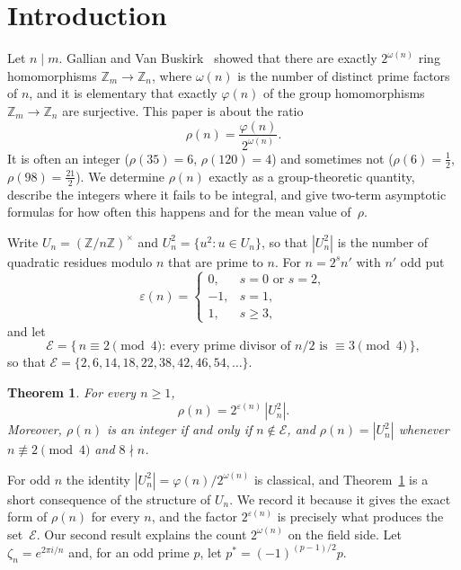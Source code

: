 \documentclass[11pt]{article}
\newtheorem{theorem}{Theorem}[section]
\theoremstyle{definition}
\newcommand{\Z}{\mathbb{Z}}
\newcommand{\E}{\mathcal{E}}
\renewcommand{\phi}{\varphi}
\renewcommand{\epsilon}{\varepsilon}
\begin{document}
\vspace{4mm}

\section{Introduction}\label{sec:intro}

Let $n\mid m$. Gallian and Van Buskirk~\cite{GVB} showed that there are exactly $2^{\omega(n)}$ ring homomorphisms $\Z_m\to\Z_n$, where $\omega(n)$ is the number of distinct prime factors of $n$, and it is elementary that exactly $\phi(n)$ of the group homomorphisms $\Z_m\to\Z_n$ are surjective. This paper is about the ratio
\begin{equation}\label{eq:rho}
  \rho(n)=\frac{\phi(n)}{2^{\omega(n)}} .
\end{equation}
It is often an integer ($\rho(35)=6$, $\rho(120)=4$) and sometimes not ($\rho(6)=\tfrac12$, $\rho(98)=\tfrac{21}{2}$). We determine $\rho(n)$ exactly as a group-theoretic quantity, describe the integers where it fails to be integral, and give two-term asymptotic formulas for how often this happens and for the mean value of~$\rho$.

Write $U_n=(\Z/n\Z)^\times$ and $U_n^2=\{u^2:u\in U_n\}$, so that $|U_n^2|$ is the number of quadratic residues modulo $n$ that are prime to $n$. For $n=2^s n'$ with $n'$ odd put
\begin{equation}\label{eq:eps}
  \epsilon(n)=\begin{cases} 0, & s=0 \text{ or } s=2,\\ -1, & s=1,\\ 1, & s\ge 3,\end{cases}
\end{equation}
and let
\begin{equation}\label{eq:E}
  \E=\{\,n\equiv 2 \!\!\pmod 4:\ \text{every prime divisor of } n/2 \text{ is } \equiv 3 \!\!\pmod 4\,\},
\end{equation}
so that $\E=\{2,6,14,18,22,38,42,46,54,\dots\}$.

\begin{theorem}\label{thm:main}
For every $n\ge1$,
\[
  \rho(n)=2^{\epsilon(n)}\,|U_n^2| .
\]
Moreover, $\rho(n)$ is an integer if and only if $n\notin\E$, and $\rho(n)=|U_n^2|$ whenever $n\not\equiv 2\pmod 4$ and $8\nmid n$.
\end{theorem}

For odd $n$ the identity $|U_n^2|=\phi(n)/2^{\omega(n)}$ is classical, and Theorem~\ref{thm:main} is a short consequence of the structure of $U_n$. We record it because it gives the exact form of $\rho(n)$ for every $n$, and the factor $2^{\epsilon(n)}$ is precisely what produces the set~$\E$. Our second result explains the count $2^{\omega(n)}$ on the field side. Let $\zeta_n=e^{2\pi i/n}$ and, for an odd prime $p$, let $p^*=(-1)^{(p-1)/2}p$.
\end{document}
